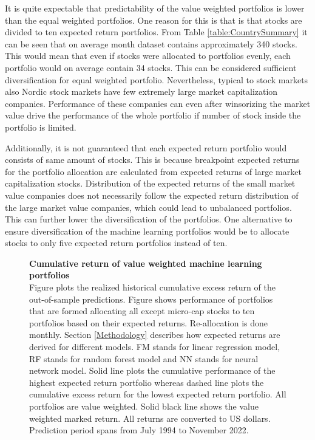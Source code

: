 \documentclass{article}
\begin{document}
It is quite expectable that predictability of the value weighted portfolios is lower than the equal weighted portfolios. One reason for this is that is that stocks are divided to ten expected return portfolios. From Table \ref{table:CountrySummary} it can be seen that on average month dataset contains approximately 340 stocks. This would mean that even if stocks were allocated to portfolios evenly, each portfolio would on average contain 34 stocks. This can be considered sufficient diversification for equal weighted portfolio. Nevertheless, typical to stock markets also Nordic stock markets have few extremely large market capitalization companies. Performance of these companies can even after winsorizing the market value drive the performance of the whole portfolio if number of stock inside the portfolio is limited. \par

Additionally, it is not guaranteed that each expected return portfolio would consists of same amount of stocks. This is because breakpoint expected returns for the portfolio allocation are calculated from expected returns of large market capitalization stocks. Distribution of the expected returns of the small market value companies does not necessarily follow the expected return distribution of the large market value companies, which could lead to unbalanced portfolios. This can further lower the diversification of the portfolios. One alternative to ensure diversification of the machine learning portfolios would be to allocate stocks to only five expected return portfolios instead of ten. \par

\begin{figure}[ht]
\centering
\caption[Cumulative return of value weighted machine learning portfolios]{\textbf{Cumulative return of value weighted machine learning portfolios}\\ Figure plots the realized historical cumulative excess return of the out-of-sample predictions. Figure shows performance of portfolios that are formed allocating all except micro-cap stocks to ten portfolios based on their expected returns. Re-allocation is done monthly. Section \ref{Methodology} describes how expected returns are derived for different models. FM stands for linear regression model, RF stands for random forest model and NN stands for neural network model. Solid line plots the cumulative performance of the highest expected return portfolio whereas dashed line plots the cumulative excess return for the lowest expected return portfolio. All portfolios are value weighted. Solid black line shows the value weighted marked return. All returns are converted to US dollars. Prediction period spans from July 1994 to November 2022.}

\label{plot:cumul_vw_portf_return}
\end{figure}
\end{document}
